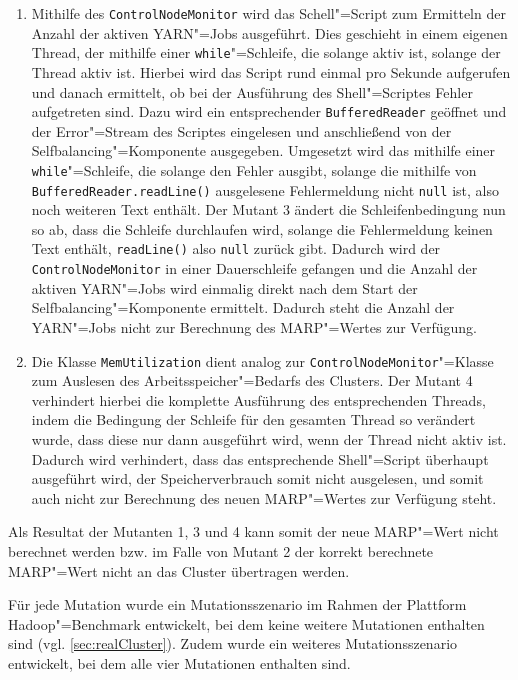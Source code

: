 \begin{enumerate}[itemsep=5pt]
    \item
    Mithilfe des \texttt{ControlNodeMonitor} wird das Schell"=Script zum Ermitteln der Anzahl der aktiven YARN"=Jobs ausgeführt.
    Dies geschieht in einem eigenen Thread, der mithilfe einer \texttt{while}"=Schleife, die solange aktiv ist, solange der Thread aktiv ist.
    Hierbei wird das Script rund einmal pro Sekunde aufgerufen und danach ermittelt, ob bei der Ausführung des Shell"=Scriptes Fehler aufgetreten sind.
    Dazu wird ein entsprechender \texttt{BufferedReader} geöffnet und der Error"=Stream des Scriptes eingelesen und anschließend von der Selfbalancing"=Komponente ausgegeben.
    Umgesetzt wird das mithilfe einer \texttt{while}"=Schleife, die solange den Fehler ausgibt, solange die mithilfe von \texttt{BufferedReader.readLine()} ausgelesene Fehlermeldung nicht \texttt{null} ist, also noch weiteren Text enthält.
    Der Mutant 3 ändert die Schleifenbedingung nun so ab, dass die Schleife durchlaufen wird, solange die Fehlermeldung keinen Text enthält, \texttt{readLine()} also \texttt{null} zurück gibt.
    Dadurch wird der \texttt{ControlNodeMonitor} in einer Dauerschleife gefangen und die Anzahl der aktiven YARN"=Jobs wird einmalig direkt nach dem Start der Selfbalancing"=Komponente ermittelt.
    Dadurch steht die Anzahl der YARN"=Jobs nicht zur Berechnung des \gls{MARP}"=Wertes zur Verfügung.
            
    \item
    Die Klasse \texttt{MemUtilization} dient analog zur \texttt{ControlNodeMonitor}"=Klasse zum Auslesen des Arbeitsspeicher"=Bedarfs des Clusters.
    Der Mutant 4 verhindert hierbei die komplette Ausführung des entsprechenden Threads, indem die Bedingung der Schleife für den gesamten Thread so verändert wurde, dass diese nur dann ausgeführt wird, wenn der Thread nicht aktiv ist.
    Dadurch wird verhindert, dass das entsprechende Shell"=Script überhaupt ausgeführt wird, der Speicherverbrauch somit nicht ausgelesen, und somit auch nicht zur Berechnung des neuen \gls{MARP}"=Wertes zur Verfügung steht.
\end{enumerate}

Als Resultat der Mutanten 1, 3 und 4 kann somit der neue \gls{MARP}"=Wert nicht berechnet werden bzw. im Falle von Mutant 2 der korrekt berechnete \gls{MARP}"=Wert nicht an das Cluster übertragen werden.

Für jede Mutation wurde ein Mutationsszenario im Rahmen der Plattform Hadoop"=Benchmark entwickelt, bei dem keine weitere Mutationen enthalten sind (vgl. \cref{sec:realCluster}).
Zudem wurde ein weiteres Mutationsszenario entwickelt, bei dem alle vier Mutationen enthalten sind.

